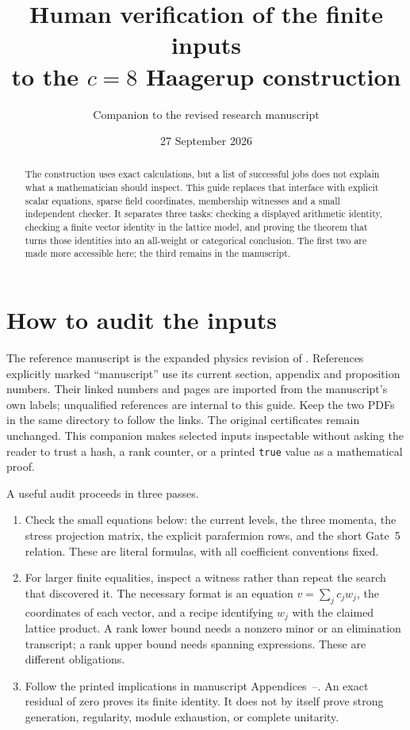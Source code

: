 \documentclass[11pt]{article}
\title{Human verification of the finite inputs\\to the $c=8$ Haagerup construction}
\author{Companion to the revised research manuscript}
\date{27 September 2026}
\newcommand{\artifact}[1]{\path{#1}}
\theoremstyle{remark}\newtheorem{remark}[proposition]{Remark}
\begin{document}
\maketitle
\begin{abstract}
The construction uses exact calculations, but a list of successful jobs
does not explain what a mathematician should inspect. This guide replaces
that interface with explicit scalar equations, sparse field coordinates,
membership witnesses and a small independent checker. It separates three
tasks: checking a displayed arithmetic identity, checking a finite vector
identity in the lattice model, and proving the theorem that turns those
identities into an all-weight or categorical conclusion. The first two
are made more accessible here; the third remains in the manuscript.
\end{abstract}
\tableofcontents

\section{How to audit the inputs}
The reference manuscript is the expanded physics revision of
\href{hi_cft_c8_proof.pdf}{\artifact{hi_cft_c8_proof.pdf}}.
References explicitly marked ``manuscript'' use its current section,
appendix and proposition numbers. Their linked numbers and pages are
imported from the manuscript's own labels; unqualified references are
internal to this guide. Keep the two PDFs in the same directory to follow
the links. The original certificates remain unchanged.
This companion makes selected inputs inspectable without
asking the reader to trust a hash, a rank counter, or a printed
\texttt{true} value as a mathematical proof.

A useful audit proceeds in three passes.
\begin{enumerate}
\item Check the small equations below: the current levels, the three
momenta, the stress projection matrix, the explicit parafermion rows,
and the short Gate~5 relation. These are literal formulas, with all
coefficient conventions fixed.
\item For larger finite equalities, inspect a witness rather than repeat
the search that discovered it. The necessary format is an equation
$v=\sum_j c_jw_j$, the coordinates of each vector, and a recipe identifying
$w_j$ with the claimed lattice product. A rank lower bound needs a
nonzero minor or an elimination transcript; a rank upper bound needs
spanning expressions. These are different obligations.
\item Follow the printed implications in manuscript
Appendices~--.
An exact residual of zero proves its finite identity. It does not by
itself prove strong generation, regularity, module exhaustion, or
complete unitarity.
\end{enumerate}
\end{document}
